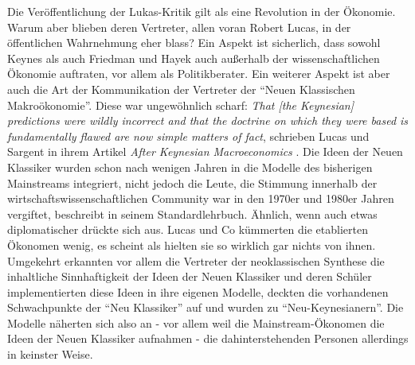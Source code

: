 Die Veröffentlichung der Lukas-Kritik gilt als eine Revolution in der Ökonomie. Warum aber blieben deren Vertreter, allen voran Robert Lucas, in der öffentlichen Wahrnehmung eher blass? Ein Aspekt ist sicherlich, dass sowohl Keynes als auch Friedman und Hayek auch außerhalb der wissenschaftlichen Ökonomie auftraten, vor allem als Politikberater. Ein weiterer Aspekt ist aber auch die Art der Kommunikation der Vertreter der "`Neuen Klassischen Makroökonomie"'. Diese war ungewöhnlich scharf: \textit{That [the Keynesian] predictions were wildly incorrect and that the doctrine on which they were based is fundamentally flawed are now simple matters of fact}, schrieben Lucas und Sargent in ihrem Artikel \textit{After Keynesian Macroeconomics} \parencite[S. 1]{Lucas1979}. Die Ideen der Neuen Klassiker wurden schon nach wenigen Jahren in die Modelle des bisherigen Mainstreams integriert, nicht jedoch die Leute, die Stimmung innerhalb der wirtschaftswissenschaftlichen Community war in den 1970er und 1980er Jahren vergiftet, beschreibt \cite{Blanchard2003} in seinem Standardlehrbuch. Ähnlich, wenn auch etwas diplomatischer drückte sich \cite{Samuelson1998} aus. Lucas und Co kümmerten die etablierten Ökonomen wenig, es scheint als hielten sie so wirklich gar nichts von ihnen. Umgekehrt erkannten vor allem die Vertreter der neoklassischen Synthese die inhaltliche Sinnhaftigkeit der Ideen der Neuen Klassiker und deren Schüler implementierten diese Ideen in ihre eigenen Modelle, deckten die vorhandenen Schwachpunkte der "`Neu Klassiker"' auf und wurden zu "`Neu-Keynesianern"'. Die Modelle näherten sich also an - vor allem weil die Mainstream-Ökonomen die Ideen der Neuen Klassiker aufnahmen - die dahinterstehenden Personen allerdings in keinster Weise. 

